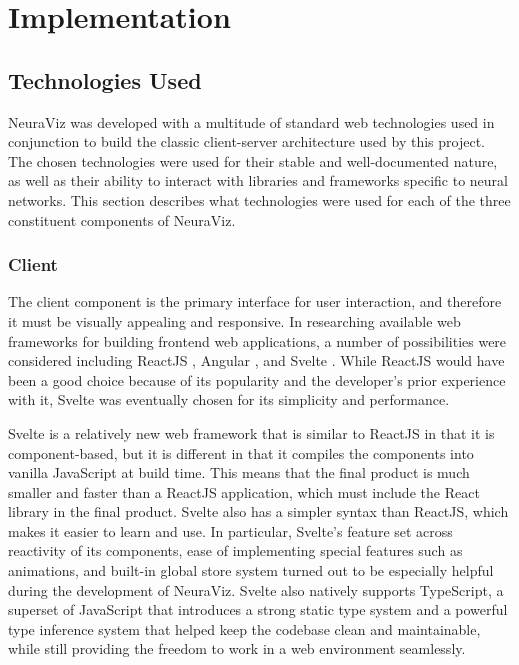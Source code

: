\section{Implementation}
\label{sec:Implementation}

\subsection{Technologies Used}
NeuraViz was developed with a multitude of standard web technologies used in conjunction to build the classic client-server architecture used by this project. The chosen technologies were used for their stable and well-documented nature, as well as their ability to interact with libraries and frameworks specific to neural networks. This section describes what technologies were used for each of the three constituent components of NeuraViz.

\subsubsection{Client}
The client component is the primary interface for user interaction, and therefore it must be visually appealing and responsive. In researching available web frameworks for building frontend web applications, a number of possibilities were considered including ReactJS \cite{react}, Angular \cite{angular}, and Svelte \cite{svelte}. While ReactJS would have been a good choice because of its popularity and the developer's prior experience with it, Svelte was eventually chosen for its simplicity and performance. 

Svelte is a relatively new web framework that is similar to ReactJS in that it is component-based, but it is different in that it compiles the components into vanilla JavaScript at build time. This means that the final product is much smaller and faster than a ReactJS application, which must include the React library in the final product. Svelte also has a simpler syntax than ReactJS, which makes it easier to learn and use. In particular, Svelte's feature set across reactivity of its components, ease of implementing special features such as animations, and built-in global store system turned out to be especially helpful during the development of NeuraViz. Svelte also natively supports TypeScript, a superset of JavaScript that introduces a strong static type system and a powerful type inference system that helped keep the codebase clean and maintainable, while still providing the freedom to work in a web environment seamlessly.


